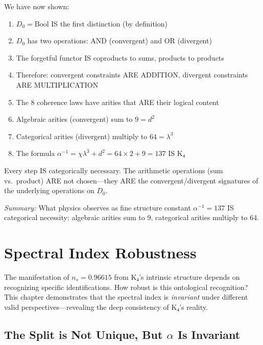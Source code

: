 \documentclass[11pt,a4paper]{book}
\begin{document}
We have now shown:

\begin{enumerate}
\item $D_0 = \text{Bool}$ IS the first distinction (by definition)
\item $D_0$ has two operations: AND (convergent) and OR (divergent)
\item The forgetful functor IS coproducts to sums, products to products
\item Therefore: convergent constraints ARE ADDITION, divergent constraints ARE MULTIPLICATION
\item The 8 coherence laws have arities that ARE their logical content
\item Algebraic arities (convergent) sum to $9 = d^2$
\item Categorical arities (divergent) multiply to $64 = \lambda^3$
\item The formula $\alpha^{-1} = \chi \lambda^3 + d^2 = 64 \times 2 + 9 = 137$ IS K₄
\end{enumerate}

Every step IS categorically necessary. The arithmetic operations (sum vs.\ product)
ARE not chosen—they ARE the convergent/divergent signatures of the 
underlying operations on $D_0$.

\medskip
\noindent\textit{Summary:} What physics observes as fine structure constant $\alpha^{-1} = 137$ 
IS categorical necessity: algebraic arities sum to 9, categorical arities multiply to 64.


\chapter{Spectral Index Robustness}
\label{chap:spectral-index-robustness}

The manifestation of $n_s = 0.96615$ from K₄'s intrinsic structure depends on recognizing specific identifications. How robust is this ontological recognition? This chapter demonstrates that the spectral index is \emph{invariant} under different valid perspectives—revealing the deep consistency of K₄'s reality.

\section{The Split is Not Unique, But \texorpdfstring{$\alpha$}{α} Is Invariant}
\label{sec:alpha-robustness}
\end{document}
